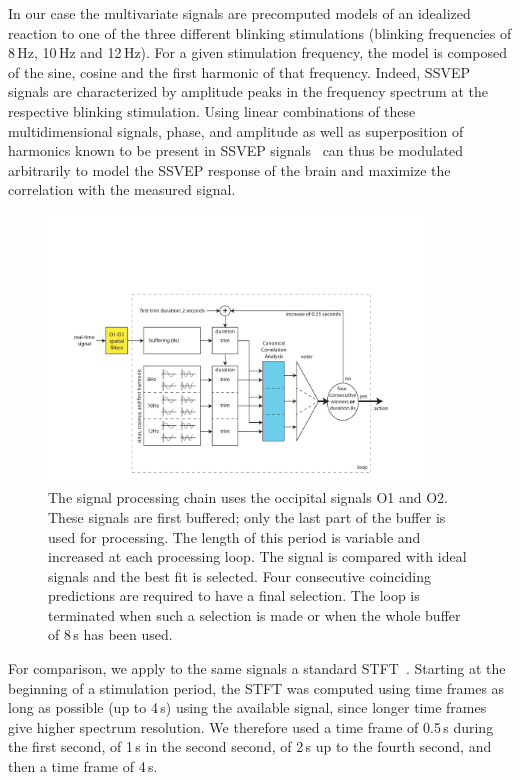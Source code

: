 \documentclass[smallextended]{svjour3}
\begin{document}
In our case the multivariate signals are precomputed models of an idealized reaction to one of the three different blinking stimulations (blinking frequencies of 8\,Hz, 10\,Hz and 12\,Hz).
For a given stimulation frequency, the model is composed of the sine, cosine and the first harmonic of that frequency.
Indeed, SSVEP signals are characterized by amplitude peaks in the frequency spectrum at the respective blinking stimulation.
Using linear combinations of these multidimensional signals, phase, and amplitude as well as superposition of harmonics known to be present in SSVEP signals~\cite{herrmann2001} can thus be modulated arbitrarily to model the SSVEP response of the brain and maximize the correlation with the measured signal.

\begin{figure}
\center
\includegraphics[width=0.9\textwidth]{figures/schema-openvibe-cca.pdf}
\caption{The signal processing chain uses the occipital signals O1 and O2. These signals are first buffered; only the last part of the buffer is used for processing. The length of this period is variable and increased at each processing loop. The signal is compared with ideal signals and the best fit is selected. Four consecutive coinciding predictions are required to have a final selection. The loop is terminated when such a selection is made or when the whole buffer of 8\,s has been used.}
\label{fig:schema-openvibe-cca}
\end{figure}

For comparison, we apply to the same signals a standard STFT~\cite{Durak2003}. 
Starting at the beginning of a stimulation period, the STFT was computed using time frames as long as possible (up to 4\,s) using the available signal, since longer time frames give higher spectrum resolution. %
We therefore used a time frame of 0.5\,s during the first second, of 1\,s in the second second, of 2\,s up to the fourth second, and then a time frame of 4\,s.
\end{document}
